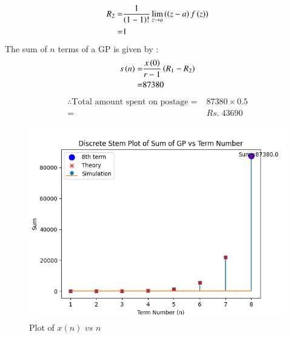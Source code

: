 \documentclass[journal,12pt,twocolumn]{IEEEtran}
\theoremstyle{remark}
\begin{document}
\begin{align}
R_2 =& \frac{1}{\brak{1 - 1}!} \lim_{z \to a} \brak{\brak{z - a}f\brak{z}}\\
	=& 1
\end{align}
The sum of $n$ terms of a GP is given by :
\begin{align}
s\brak{n}=&\dfrac{x\brak{0}}{r-1} \brak{R_1 -R_2}\\
		 =& 87380\\
\end{align}
\begin{align}
\therefore \text{Total amount spent on postage}=& 87380 \times 0.5 \\ 
             =& Rs.\; 43690
\end{align}

\begin{figure}[ht]
	\centering
    \includegraphics[width=\columnwidth]{figs/figure1.png}
    \caption{Plot of $x(n)$ $vs$ $n$}
    \label{fig: 11.9.5.29.2}
\end{figure}
\end{document}
